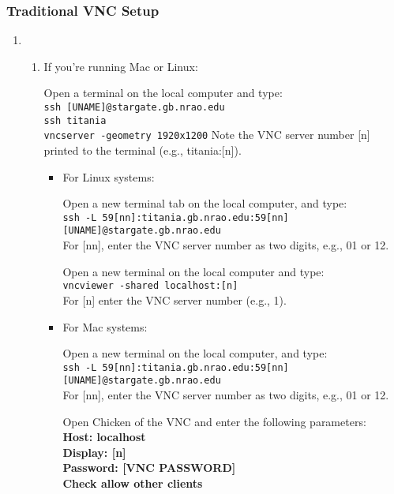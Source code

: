 \documentclass[11pt, reqno, tbtags]{article}
\begin{document}
\subsubsection{Traditional VNC Setup}\label{sssec:old} %
\begin{enumerate}
 \item \begin{enumerate}
  \item \label{st:vnc} If you're running Mac or Linux: %
  
  Open a terminal on the local computer and type: \\
  \indent\texttt{ssh [UNAME]@stargate.gb.nrao.edu \\
  \indent ssh titania \\                                                                   
  \indent vncserver -geometry 1920x1200}
  Note the VNC server number [n] printed to the terminal (e.g., titania:[n]).         
  \begin{itemize}
   \item\label{st:open} %
   For Linux systems: 
   
   Open a new terminal tab on the local computer, and type: \\
   \indent\texttt{ssh -L 59[nn]:titania.gb.nrao.edu:59[nn] [UNAME]@stargate.gb.nrao.edu} \\       
   For [nn], enter the VNC server number as two digits, e.g., 01 or 12.
   
   Open a new terminal on the local computer and type: \\
   \texttt{vncviewer -shared localhost:[n]} \\
   For [n] enter the VNC server number (e.g., 1). 

   \item For Mac systems: %
   
   Open a new terminal on the local computer, and type: \\
   \texttt{ssh -L 59[nn]:titania.gb.nrao.edu:59[nn] [UNAME]@stargate.gb.nrao.edu} \\        
   For [nn], enter the VNC server number as two digits, e.g., 01 or 12.
   
   Open Chicken of the VNC and enter the following parameters: \\
   \textbf{Host: localhost \\
   Display: [n] \\
   Password: [VNC PASSWORD] \\
   Check allow other clients }


\end{itemize}
\end{enumerate}
\end{enumerate}
\end{document}
